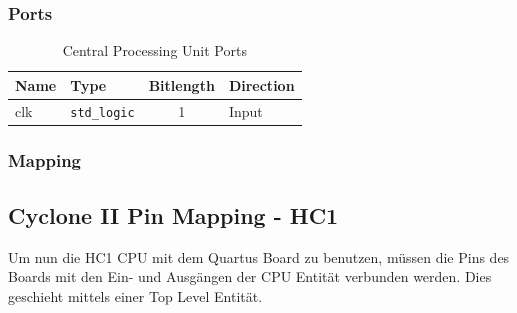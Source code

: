 \subsubsection{Ports}

\vspace{1em}
\begin{table}[!h]
	\centering
	\begin{tabular}{|l|l|c|l|}
		\hline
		\textbf{Name} & \textbf{Type} & \textbf{Bitlength} & \textbf{Direction}\\
		\hline
		clk & \texttt{std\_logic} & 1 & Input \\
		\hline
	\end{tabular}
	\caption{Central Processing Unit Ports}
	\label{tab:cpu_ports}
\end{table}

\subsubsection{Mapping}


\pagebreak
\subsection{Cyclone II Pin Mapping - HC1}

Um nun die HC1 CPU mit dem Quartus Board zu benutzen, müssen die Pins des Boards mit den Ein- und Ausgängen der CPU Entität verbunden werden. Dies geschieht mittels einer Top Level Entität.
